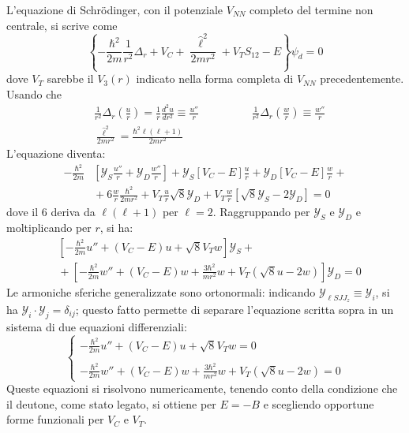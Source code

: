 \documentclass[11pt, a4paper]{scrartcl}
\theoremstyle{style}
\numberwithin{equation}{subsection}
\begin{document}
L'equazione di Schr\"odinger, con il potenziale $V_{N N}$ completo del termine non centrale, si scrive come
\[
\left\{ - \frac{\hbar ^2}{2m} \frac{1}{r^2} \Delta _r + V_C + \frac{\hat{\ell }^2}{2mr^2} + V_T S_{12} - E \right\} \psi _d = 0
\] 
dove $V_T$ sarebbe il $V_3(r)$ indicato nella forma completa di $V_{NN}$ precedentemente.
Usando che
\[
\begin{split}
	&\frac{1}{r^2} \Delta _r \left(\frac{u}{r}\right) = \frac{1}{r} \frac{d ^2 u }{d  r^2}  \equiv \frac{u''}{r} \hspace{2cm}\frac{1}{r^2} \Delta _r \left(\frac{w}{r}\right) \equiv \frac{w''}{r}\\
	& \frac{\hat{\ell }^2}{2mr^2} = \frac{\hbar ^2 \ell (\ell +1)}{2mr^2}
\end{split}
\] 
L'equazione diventa:
\[
\begin{split}
	-\frac{\hbar ^2}{2m} &\left[ \mathcal{Y} _S \frac{u''}{r} + \mathcal{Y} _D \frac{w''}{r} \right] + \mathcal{Y} _S \left[ V_C - E \right]  \frac{u}{r} + \mathcal{Y} _D \left[ V_C - E \right]  \frac{w}{r} + { } \\
			     & { } +6\frac{w}{r} \frac{\hbar ^2}{2mr^2}+ V_T \frac{u}{r} \sqrt{8} \mathcal{Y} _D + V_T \frac{w}{r} \left[ \sqrt{8}  \mathcal{Y} _S - 2 \mathcal{Y} _D  \right]  =0
\end{split}
\] 
dove il $6$ deriva da $\ell (\ell +1)$ per $\ell  = 2 $.
Raggruppando per $\mathcal{Y} _S $ e $\mathcal{Y} _D$ e moltiplicando per $r$, si ha:
\begin{equation}
	\begin{split}
		&\left[- \frac{\hbar ^2}{2m} u'' + (V_C - E) u + \sqrt{8} V_T w \right]  \mathcal{Y} _S + { } \\
		& { }+\left[ -\frac{\hbar^2}{2m}w '' + (V_C - E) w + \frac{3 \hbar ^2}{m r^2} w + V_T \left(\sqrt{8} u - 2 w\right)  \right] \mathcal{Y} _D = 0
	\end{split}
\end{equation}
Le armoniche sferiche generalizzate sono ortonormali: indicando $\mathcal{Y} _{\ell S J J_z} \equiv \mathcal{Y} _i$, si ha $\mathcal{Y} _i \cdot \mathcal{Y} _j = \delta _{ij}$; questo fatto permette di separare l'equazione scritta sopra in un sistema di due equazioni differenziali:
\begin{equation}
	\begin{cases}
		\displaystyle - \frac{\hbar ^2}{2m} u'' + (V_C - E) u + \sqrt{8}  V_T w = 0 \\ 
		\\
		\displaystyle -\frac{\hbar ^2}{2m}w'' + ( V_C - E) w + \frac{3 \hbar ^2 }{mr^2} w + V_T (\sqrt{8} u- 2w) = 0
	\end{cases}
\end{equation}
Queste equazioni si risolvono numericamente, tenendo conto della condizione che il deutone, come stato legato, si ottiene per $E = - B$ e scegliendo opportune forme funzionali per $V_C$ e $V_T$.
\end{document}
